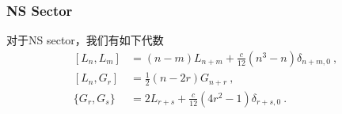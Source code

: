 \subsubsection{NS Sector}
对于NS sector，我们有如下代数
\begin{equation}
\begin{aligned}
\left[ L_n,L_m \right] &= (n-m) L_{n+m} + \frac{c}{12} (n^3-n) \delta_{n+m,0}~,\\
[L_n,G_r] &= \frac{1}{2} (n-2r) G_{n+r}~, \\
\{ G_r, G_s \} &= 2 L_{r+s} + \frac{c}{12} (4 r^2 - 1) \delta_{r+s,0}~.
\end{aligned}
\end{equation}


























































